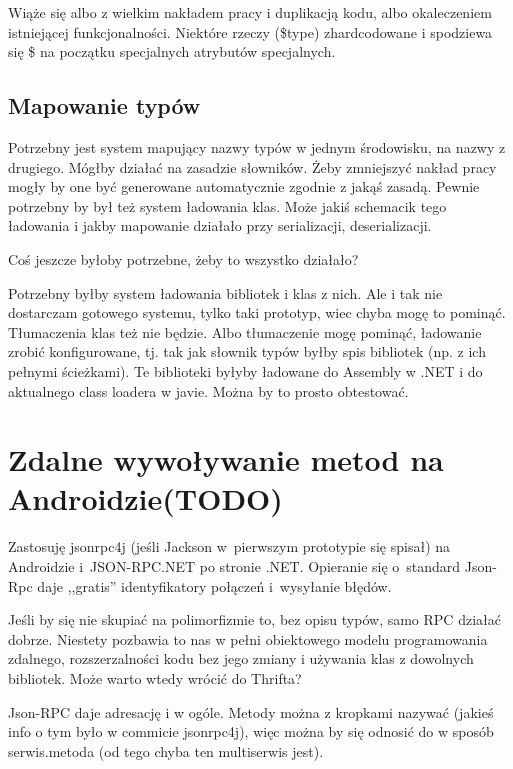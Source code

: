 Wiąże się albo z wielkim nakładem pracy i duplikacją kodu, albo okaleczeniem istniejącej funkcjonalności. Niektóre rzeczy (\$type) zhardcodowane i spodziewa się \$ na początku specjalnych atrybutów specjalnych.


\subsection{Mapowanie typów}
Potrzebny jest system mapujący nazwy typów w jednym środowisku, na nazwy z drugiego. Mógłby działać na zasadzie słowników. Żeby zmniejszyć nakład pracy mogły by one być generowane automatycznie zgodnie z jakąś zasadą.
Pewnie potrzebny by był też system ładowania klas.
Może jakiś schemacik tego ładowania i jakby mapowanie działało przy serializacji, deserializacji.

Coś jeszcze byłoby potrzebne, żeby to wszystko działało?

Potrzebny byłby system ładowania bibliotek i klas z nich. Ale i tak nie dostarczam gotowego systemu, tylko taki prototyp, wiec chyba mogę to pominąć. Tłumaczenia klas też nie będzie. Albo tłumaczenie mogę pominąć, ładowanie zrobić konfigurowane, tj. tak jak słownik typów byłby spis bibliotek (np. z ich pełnymi ścieżkami). Te biblioteki byłyby ładowane do Assembly w .NET i do aktualnego class loadera w javie. Można by to prosto obtestować.



\section{Zdalne wywoływanie metod na Androidzie(TODO)}
Zastosuję jsonrpc4j (jeśli Jackson w~pierwszym prototypie się spisał) na Androidzie i~JSON-RPC.NET po stronie .NET\@.
Opieranie się o~standard Json-Rpc daje ,,gratis'' identyfikatory połączeń i~wysyłanie błędów.

Jeśli by się nie skupiać na polimorfizmie to, bez opisu typów, samo RPC działać dobrze. Niestety pozbawia to nas w pełni obiektowego modelu programowania zdalnego, rozszerzalności kodu bez jego zmiany i używania klas z dowolnych bibliotek. Może warto wtedy wrócić do Thrifta?

Json-RPC daje adresację i w ogóle. Metody można z kropkami nazywać (jakieś info o tym było w commicie jsonrpc4j), więc można by się odnosić do w sposób serwis.metoda (od tego chyba ten multiserwis jest).

